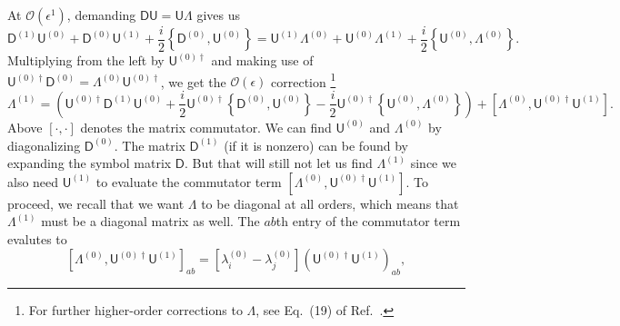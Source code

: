 At $\mathcal{O}(\epsilon^{1})$, demanding $\mathsf{D}\mathsf{U} = \mathsf{U}\Lambda$ gives us
%
\begin{equation}
\mathsf{D}^{(1)}\mathsf{U}^{(0)} + \mathsf{D}^{(0)}\mathsf{U}^{(1)} + \frac{i}{2}\left\{\mathsf{D}^{(0)}, \mathsf{U}^{(0)}\right\} =
  \mathsf{U}^{(1)}\Lambda^{(0)} + \mathsf{U}^{(0)}\Lambda^{(1)} + \frac{i}{2}\left\{\mathsf{U}^{(0)}, \Lambda^{(0)}\right\}.
\end{equation}
%
Multiplying from the left by $\mathsf{U}^{(0)\dagger}$ and making use of $\mathsf{U}^{(0)\dagger}\mathsf{D}^{(0)} = \Lambda^{(0)}\mathsf{U}^{(0)\dagger}$, we get the $\mathcal{O}(\epsilon)$ correction%
\footnote{For further higher-order corrections to $\Lambda$, see Eq.~(19) of Ref.~\cite{weigert1993}.}
%
\begin{equation}
  \Lambda^{(1)} = \left(\mathsf{U}^{(0)\dagger}\mathsf{D}^{(1)}\mathsf{U}^{(0)} +
  \frac{i}{2}\mathsf{U}^{(0)\dagger}\left\{\mathsf{D}^{(0)},\mathsf{U}^{(0)}\right\} - \frac{i}{2}\mathsf{U}^{(0)\dagger}\left\{\mathsf{U}^{(0)},\Lambda^{(0)}\right\}\right) + \left[\Lambda^{(0)},\mathsf{U}^{(0)\dagger}\mathsf{U}^{(1)}\right].
  \label{eq:Lambda1}
\end{equation}
%
Above $[\cdot,\cdot]$ denotes the matrix commutator.
We can find $\mathsf{U}^{(0)}$ and $\Lambda^{(0)}$ by diagonalizing $\mathsf{D}^{(0)}$.
The matrix $\mathsf{D}^{(1)}$ (if it is nonzero) can be found by expanding the symbol matrix $\mathsf{D}$.
But that will still not let us find $\Lambda^{(1)}$ since we also need $\mathsf{U}^{(1)}$ to evaluate the commutator term $[\Lambda^{(0)},\mathsf{U}^{(0)\dagger}\mathsf{U}^{(1)}]$.
To proceed, we recall that we want $\Lambda$ to be diagonal at all orders, which means that $\Lambda^{(1)}$ must be a diagonal matrix as well.
The $ab$th entry of the commutator term evalutes to
%
\begin{equation}
    \left[\Lambda^{(0)},\mathsf{U}^{(0)\dagger}\mathsf{U}^{(1)}\right]_{ab} = %
    \left[\lambda^{(0)}_{i} - \lambda^{(0)}_{j}\right]\left(\mathsf{U}^{(0)\dagger}\mathsf{U}^{(1)}\right)_{ab},
    \label{eq:diagonal}
\end{equation}
